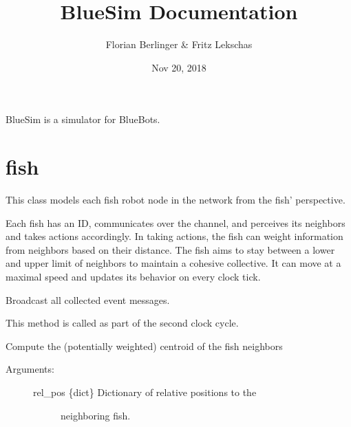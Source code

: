 \documentclass[letterpaper,10pt,english]{sphinxmanual}
\title{BlueSim Documentation}
\date{Nov 20, 2018}
\author{Florian Berlinger & Fritz Lekschas}
\begin{document}
\pagestyle{empty}
\maketitle
\pagestyle{plain}
\sphinxtableofcontents
\pagestyle{normal}
\label{\detokenize{index::doc}}


BlueSim is a simulator for BlueBots.


\chapter{fish}
\label{\detokenize{index:module-fish}}\label{\detokenize{index:fish}}

\begin{fulllineitems}
\label{\detokenize{index:fish.Fish}}
This class models each fish robot node in the network from the fish’
perspective.

Each fish has an ID, communicates over the channel, and perceives its
neighbors and takes actions accordingly. In taking actions, the fish can
weight information from neighbors based on their distance. The fish aims to
stay between a lower and upper limit of neighbors to maintain a cohesive
collective. It can move at a maximal speed and updates its behavior on
every clock tick.

\begin{fulllineitems}
\label{\detokenize{index:fish.Fish.communicate}}
Broadcast all collected event messages.

This method is called as part of the second clock cycle.

\end{fulllineitems}


\begin{fulllineitems}
\label{\detokenize{index:fish.Fish.comp_center}}
Compute the (potentially weighted) centroid of the fish neighbors
\begin{description}
\item[{Arguments:}] \leavevmode\begin{description}
\item[{rel\_pos \{dict\} \textendash{} Dictionary of relative positions to the}] \leavevmode
neighboring fish.


\end{description}
\end{description}
\end{fulllineitems}
\end{fulllineitems}
\end{document}
